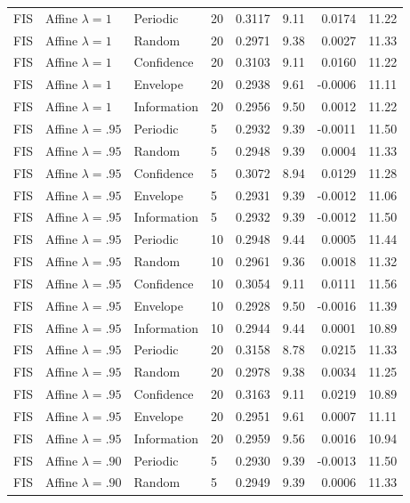 \begin{longtable}{llllrrrr}
FIS & Affine $\lambda=1$ & Periodic & 20 & 0.3117 & 9.11 & 0.0174 & 11.22 \\
FIS & Affine $\lambda=1$ & Random & 20 & 0.2971 & 9.38 & 0.0027 & 11.33 \\
FIS & Affine $\lambda=1$ & Confidence & 20 & 0.3103 & 9.11 & 0.0160 & 11.22 \\
FIS & Affine $\lambda=1$ & Envelope & 20 & 0.2938 & 9.61 & -0.0006 & 11.11 \\
FIS & Affine $\lambda=1$ & Information & 20 & 0.2956 & 9.50 & 0.0012 & 11.22 \\
FIS & Affine $\lambda=.95$ & Periodic & 5 & 0.2932 & 9.39 & -0.0011 & 11.50 \\
FIS & Affine $\lambda=.95$ & Random & 5 & 0.2948 & 9.39 & 0.0004 & 11.33 \\
FIS & Affine $\lambda=.95$ & Confidence & 5 & 0.3072 & 8.94 & 0.0129 & 11.28 \\
FIS & Affine $\lambda=.95$ & Envelope & 5 & 0.2931 & 9.39 & -0.0012 & 11.06 \\
FIS & Affine $\lambda=.95$ & Information & 5 & 0.2932 & 9.39 & -0.0012 & 11.50 \\
FIS & Affine $\lambda=.95$ & Periodic & 10 & 0.2948 & 9.44 & 0.0005 & 11.44 \\
FIS & Affine $\lambda=.95$ & Random & 10 & 0.2961 & 9.36 & 0.0018 & 11.32 \\
FIS & Affine $\lambda=.95$ & Confidence & 10 & 0.3054 & 9.11 & 0.0111 & 11.56 \\
FIS & Affine $\lambda=.95$ & Envelope & 10 & 0.2928 & 9.50 & -0.0016 & 11.39 \\
FIS & Affine $\lambda=.95$ & Information & 10 & 0.2944 & 9.44 & 0.0001 & 10.89 \\
FIS & Affine $\lambda=.95$ & Periodic & 20 & 0.3158 & 8.78 & 0.0215 & 11.33 \\
FIS & Affine $\lambda=.95$ & Random & 20 & 0.2978 & 9.38 & 0.0034 & 11.25 \\
FIS & Affine $\lambda=.95$ & Confidence & 20 & 0.3163 & 9.11 & 0.0219 & 10.89 \\
FIS & Affine $\lambda=.95$ & Envelope & 20 & 0.2951 & 9.61 & 0.0007 & 11.11 \\
FIS & Affine $\lambda=.95$ & Information & 20 & 0.2959 & 9.56 & 0.0016 & 10.94 \\
FIS & Affine $\lambda=.90$ & Periodic & 5 & 0.2930 & 9.39 & -0.0013 & 11.50 \\
FIS & Affine $\lambda=.90$ & Random & 5 & 0.2949 & 9.39 & 0.0006 & 11.33 \\

\end{longtable}
